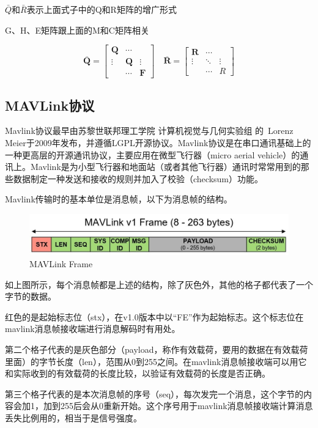 $\bar{Q}$和$\bar{R}$表示上面式子中的Q和R矩阵的增广形式

G、H、E矩阵跟上面的M和C矩阵相关

$$
\overline{\boldsymbol{Q}}=\left[\begin{array}{ccc}\boldsymbol{Q} & \cdots & \\\vdots & \boldsymbol{Q} & \vdots \\& \cdots & \boldsymbol{F}\end{array}\right] \quad \overline{\boldsymbol{R}}=\left[\begin{array}{ccc}\boldsymbol{R} & \cdots & \\\vdots & \ddots & \vdots \\& \cdots & R\end{array}\right]
$$

\subsection{MAVLink协议}

Mavlink协议最早由苏黎世联邦理工学院 计算机视觉与几何实验组 的 Lorenz Meier于2009年发布，并遵循LGPL开源协议。Mavlink协议是在串口通讯基础上的一种更高层的开源通讯协议，主要应用在微型飞行器（micro aerial vehicle）的通讯上。Mavlink是为小型飞行器和地面站（或者其他飞行器）通讯时常常用到的那些数据制定一种发送和接收的规则并加入了校验（checksum）功能\cite{ArtE4}。

Mavlink传输时的基本单位是消息帧，以下为消息帧的结构。

\begin{figure}[ht]
  \centering
  \includegraphics[width=0.8\linewidth]{./Figure/Mavlink_Frame.jpg}
  \caption{MAVLink Frame}\label{Fig:img7}
\end{figure}

如上图所示，每个消息帧都是上述的结构，除了灰色外，其他的格子都代表了一个字节的数据。

红色的是起始标志位（stx），在v1.0版本中以“FE”作为起始标志。这个标志位在mavlink消息帧接收端进行消息解码时有用处。

第二个格子代表的是灰色部分（payload，称作有效载荷，要用的数据在有效载荷里面）的字节长度（len），范围从0到255之间。在mavlink消息帧接收端可以用它和实际收到的有效载荷的长度比较，以验证有效载荷的长度是否正确。

第三个格子代表的是本次消息帧的序号（seq），每次发完一个消息，这个字节的内容会加1，加到255后会从0重新开始。这个序号用于mavlink消息帧接收端计算消息丢失比例用的，相当于是信号强度。

